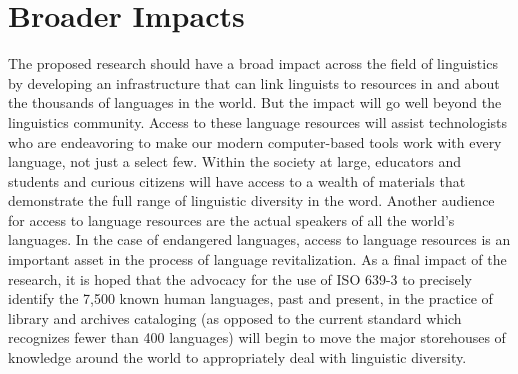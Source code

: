 \documentclass[11pt]{nsf}
\begin{document}
\section*{Broader Impacts}

The proposed research should have a broad impact across the field of
linguistics by developing an infrastructure that can link linguists to
resources in and about the thousands of languages in the world. But the
impact will go well beyond the linguistics community. Access to these
language resources will assist technologists who are endeavoring to make
our modern computer-based tools work with every language, not just a select
few.  Within the society at large, educators and students and curious
citizens will have access to a wealth of materials that demonstrate the
full range of linguistic diversity in the word. Another audience for access
to language resources are the actual speakers of all the world's languages.
In the case of endangered languages, access to language resources is an
important asset in the process of language revitalization. As a final
impact of the research, it is hoped that the advocacy for the use of ISO
639-3 to precisely identify the 7,500 known human languages, past and
present, in the practice of library and archives cataloging (as opposed to
the current standard which recognizes fewer than 400 languages) will begin
to move the major storehouses of knowledge around the world to
appropriately deal with linguistic diversity.
\end{document}
